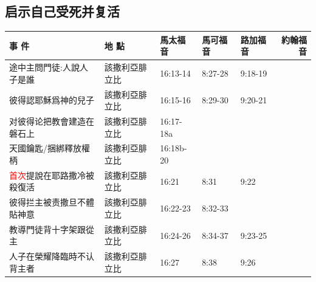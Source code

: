 \subsection{启示自己受死并复活}
\begin{table}[H] \centering 
\begin{tabular}{p{13.07em}|l|l|l|p{5.285em}|r}\toprule
\textbf{事 件} & \multicolumn{1}{p{7.93em}|}{\textbf{地 點}} & \multicolumn{1}{p{5.285em}|}{\textbf{馬太福音}} & \multicolumn{1}{p{5.57em}|}{\textbf{馬可福音}} & \textbf{路加福音} & \multicolumn{1}{p{4.855em}}{\textbf{約翰福音}} \\\midrule

途中主問門徒:人說人子是誰& \multicolumn{1}{p{7.93em}|}{該撒利亞腓立比} & \multicolumn{1}{p{5.285em}|}{16:13-14} & \multicolumn{1}{p{5.57em}|}{8:27-28} & 9:18-19&  \\ \midrule

彼得認耶穌爲神的兒子 & \multicolumn{1}{p{7.93em}|}{該撒利亞腓立比} & \multicolumn{1}{p{5.285em}|}{16:15-16} & \multicolumn{1}{p{5.57em}|}{8:29-30} & 9:20-21&  \\ \midrule

对彼得论把教會建造在磐石上& \multicolumn{1}{p{7.93em}|}{該撒利亞腓立比} & \multicolumn{1}{p{5.285em}|}{16:17-18a} & \multicolumn{1}{p{5.57em}|}{} &  &  \\ \midrule

天國鑰匙/捆綁釋放權柄& \multicolumn{1}{p{7.93em}|}{該撒利亞腓立比} & \multicolumn{1}{p{5.285em}|}{16:18b-20} & \multicolumn{1}{p{5.57em}|}{} &  &  \\ \midrule

\textcolor{red}{首次}提說在耶路撒冷被殺復活& \multicolumn{1}{p{7.93em}|}{該撒利亞腓立比} & \multicolumn{1}{p{5.285em}|}{16:21} & \multicolumn{1}{p{5.57em}|}{8:31} & 9:22&  \\ \midrule

彼得拦主被责撒旦不體貼神意& \multicolumn{1}{p{7.93em}|}{該撒利亞腓立比} & \multicolumn{1}{p{5.285em}|}{16:22-23} & \multicolumn{1}{p{5.57em}|}{8:32-33} &&  \\ \midrule

教導門徒背十字架跟從主& \multicolumn{1}{p{7.93em}|}{該撒利亞腓立比} & \multicolumn{1}{p{5.285em}|}{16:24-26} & \multicolumn{1}{p{5.57em}|}{8:34-37} & 9:23-25&  \\ \midrule


人子在榮耀降臨時不认背主者& \multicolumn{1}{p{7.93em}|}{該撒利亞腓立比} & \multicolumn{1}{p{5.285em}|}{16:27} & \multicolumn{1}{p{5.57em}|}{8:38} & 9:26&  \\ \midrule


\end{tabular}
\end{table}
